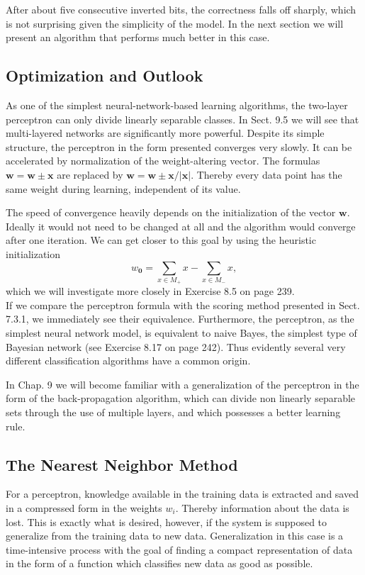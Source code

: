 \documentclass[10pt]{book}
\begin{document}
After about five consecutive inverted bits, the correctness falls off sharply, which is not surprising given the simplicity of the model. In the next section we will present an algorithm that performs much better in this case.

\subsection{Optimization and Outlook}
As one of the simplest neural-network-based learning algorithms, the two-layer perceptron can only divide linearly separable classes. In Sect. 9.5 we will see that multi-layered networks are significantly more powerful. Despite its simple\\
structure, the perceptron in the form presented converges very slowly. It can be accelerated by normalization of the weight-altering vector. The formulas $\boldsymbol{w}=\boldsymbol{w} \pm \boldsymbol{x}$ are replaced by $\boldsymbol{w}=\boldsymbol{w} \pm \boldsymbol{x} /|\boldsymbol{x}|$. Thereby every data point has the same weight during learning, independent of its value.

The speed of convergence heavily depends on the initialization of the vector $\boldsymbol{w}$. Ideally it would not need to be changed at all and the algorithm would converge after one iteration. We can get closer to this goal by using the heuristic initialization
$$
w_{\mathbf{0}}=\sum_{x \in M_{+}} x-\sum_{x \in M_{-}} x,
$$
which we will investigate more closely in Exercise 8.5 on page 239.\\
If we compare the perceptron formula with the scoring method presented in Sect. 7.3.1, we immediately see their equivalence. Furthermore, the perceptron, as the simplest neural network model, is equivalent to naive Bayes, the simplest type of Bayesian network (see Exercise 8.17 on page 242). Thus evidently several very different classification algorithms have a common origin.

In Chap. 9 we will become familiar with a generalization of the perceptron in the form of the back-propagation algorithm, which can divide non linearly separable sets through the use of multiple layers, and which possesses a better learning rule.

\subsection{The Nearest Neighbor Method}
For a perceptron, knowledge available in the training data is extracted and saved in a compressed form in the weights $w_{i}$. Thereby information about the data is lost. This is exactly what is desired, however, if the system is supposed to generalize from the training data to new data. Generalization in this case is a time-intensive process with the goal of finding a compact representation of data in the form of a function which classifies new data as good as possible.
\end{document}
